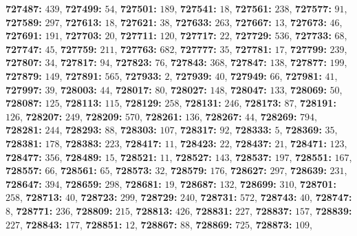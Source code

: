 \textsf{\bfseries 727487:} $439$, \textsf{\bfseries 727499:} $54$, \textsf{\bfseries 727501:} $189$, \textsf{\bfseries 727541:} $18$, \textsf{\bfseries 727561:} $238$, \textsf{\bfseries 727577:} $91$, \textsf{\bfseries 727589:} $297$, \textsf{\bfseries 727613:} $18$, \textsf{\bfseries 727621:} $38$, \textsf{\bfseries 727633:} $263$, \textsf{\bfseries 727667:} $13$, \textsf{\bfseries 727673:} $46$, \textsf{\bfseries 727691:} $191$, \textsf{\bfseries 727703:} $20$, \textsf{\bfseries 727711:} $120$, \textsf{\bfseries 727717:} $22$, \textsf{\bfseries 727729:} $536$, \textsf{\bfseries 727733:} $68$, \textsf{\bfseries 727747:} $45$, \textsf{\bfseries 727759:} $211$, \textsf{\bfseries 727763:} $682$, \textsf{\bfseries 727777:} $35$, \textsf{\bfseries 727781:} $17$, \textsf{\bfseries 727799:} $239$, \textsf{\bfseries 727807:} $34$, \textsf{\bfseries 727817:} $94$, \textsf{\bfseries 727823:} $76$, \textsf{\bfseries 727843:} $368$, \textsf{\bfseries 727847:} $138$, \textsf{\bfseries 727877:} $199$, \textsf{\bfseries 727879:} $149$, \textsf{\bfseries 727891:} $565$, \textsf{\bfseries 727933:} $2$, \textsf{\bfseries 727939:} $40$, \textsf{\bfseries 727949:} $66$, \textsf{\bfseries 727981:} $41$, \textsf{\bfseries 727997:} $39$, \textsf{\bfseries 728003:} $44$, \textsf{\bfseries 728017:} $80$, \textsf{\bfseries 728027:} $148$, \textsf{\bfseries 728047:} $133$, \textsf{\bfseries 728069:} $50$, \textsf{\bfseries 728087:} $125$, \textsf{\bfseries 728113:} $115$, \textsf{\bfseries 728129:} $258$, \textsf{\bfseries 728131:} $246$, \textsf{\bfseries 728173:} $87$, \textsf{\bfseries 728191:} $126$, \textsf{\bfseries 728207:} $249$, \textsf{\bfseries 728209:} $570$, \textsf{\bfseries 728261:} $136$, \textsf{\bfseries 728267:} $44$, \textsf{\bfseries 728269:} $794$, \textsf{\bfseries 728281:} $244$, \textsf{\bfseries 728293:} $88$, \textsf{\bfseries 728303:} $107$, \textsf{\bfseries 728317:} $92$, \textsf{\bfseries 728333:} $5$, \textsf{\bfseries 728369:} $35$, \textsf{\bfseries 728381:} $178$, \textsf{\bfseries 728383:} $223$, \textsf{\bfseries 728417:} $11$, \textsf{\bfseries 728423:} $22$, \textsf{\bfseries 728437:} $21$, \textsf{\bfseries 728471:} $123$, \textsf{\bfseries 728477:} $356$, \textsf{\bfseries 728489:} $15$, \textsf{\bfseries 728521:} $11$, \textsf{\bfseries 728527:} $143$, \textsf{\bfseries 728537:} $197$, \textsf{\bfseries 728551:} $167$, \textsf{\bfseries 728557:} $66$, \textsf{\bfseries 728561:} $65$, \textsf{\bfseries 728573:} $32$, \textsf{\bfseries 728579:} $176$, \textsf{\bfseries 728627:} $297$, \textsf{\bfseries 728639:} $231$, \textsf{\bfseries 728647:} $394$, \textsf{\bfseries 728659:} $298$, \textsf{\bfseries 728681:} $19$, \textsf{\bfseries 728687:} $132$, \textsf{\bfseries 728699:} $310$, \textsf{\bfseries 728701:} $258$, \textsf{\bfseries 728713:} $40$, \textsf{\bfseries 728723:} $299$, \textsf{\bfseries 728729:} $240$, \textsf{\bfseries 728731:} $572$, \textsf{\bfseries 728743:} $40$, \textsf{\bfseries 728747:} $8$, \textsf{\bfseries 728771:} $236$, \textsf{\bfseries 728809:} $215$, \textsf{\bfseries 728813:} $426$, \textsf{\bfseries 728831:} $227$, \textsf{\bfseries 728837:} $157$, \textsf{\bfseries 728839:} $227$, \textsf{\bfseries 728843:} $177$, \textsf{\bfseries 728851:} $12$, \textsf{\bfseries 728867:} $88$, \textsf{\bfseries 728869:} $725$, \textsf{\bfseries 728873:} $109$, 

